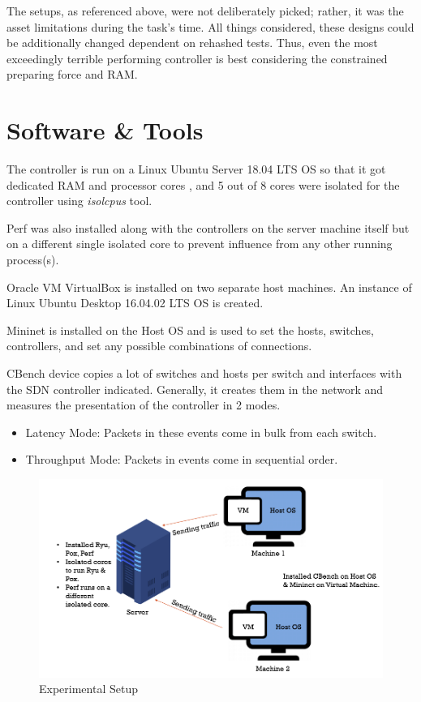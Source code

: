 The setups, as referenced above, were not deliberately picked; rather, it was the asset limitations during the task's time. All things considered, these designs could be additionally changed dependent on rehashed tests. Thus, even the most exceedingly terrible performing controller is best considering the constrained preparing force and RAM.

\section{Software \& Tools}
The controller is run on a Linux Ubuntu Server 18.04 LTS OS so that it got dedicated RAM and processor cores \cite{resshare1970}, and 5 out of 8 cores were isolated for the controller using \textit{isolcpus} tool.

Perf was also installed along with the controllers on the server machine itself but on a different single isolated core to prevent influence from any other running process(s).

Oracle VM VirtualBox is installed on two separate host machines. An instance of Linux Ubuntu Desktop 16.04.02 LTS OS is created.

Mininet is installed on the Host OS and is used to set the hosts, switches, controllers, and set any possible combinations of connections.

CBench device copies a lot of switches and hosts per switch and interfaces with the SDN controller indicated. Generally, it creates them in the network and measures the presentation of the controller in 2 modes.
    \begin{itemize}
        \item Latency Mode: Packets in these events come in bulk from each switch.
        \item Throughput Mode: Packets in events come in sequential order.
    \end{itemize}

\begin{figure}[!hbt]
    \centering
        \includegraphics[width=\textwidth,keepaspectratio]{images/setup.png}
       \caption{Experimental Setup}
        \label{experimentalsetup}
\end{figure}

